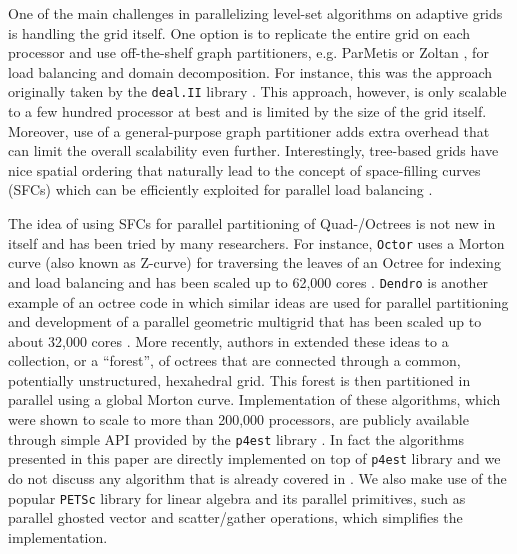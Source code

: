 One of the main challenges in parallelizing level-set algorithms on adaptive grids is handling the grid itself. One option is to replicate the entire grid on each processor and use off-the-shelf graph partitioners, e.g. ParMetis \cite{Karypis;Kumar:98:A-parallel-algorithm} or Zoltan \cite{Boman;Catalyurek;Chevalier;etal:12:The-Zoltan-and-Isorr}, for load balancing and domain decomposition. For instance, this was the approach originally taken by the \texttt{deal.II} library \cite{Bangerth;Hartmann;Kanschat:07:deal.II----a-General}. This approach, however, is only scalable to a few hundred processor at best and is limited by the size of the grid itself. Moreover, use of a general-purpose graph partitioner adds extra overhead that can limit the overall scalability even further. Interestingly, tree-based grids have nice spatial ordering that naturally lead to the concept of space-filling curves (SFCs) which can be efficiently exploited for parallel load balancing \cite{Aluru;Sevilgen:97:Parallel-domain-deco,Campbell;Devine;Flaherty;etal:03:Dynamic-octree-load-}.

The idea of using SFCs for parallel partitioning of Quad-/Octrees is not new in itself and has been tried by many researchers. For instance, \texttt{Octor} \cite{Tu;OHallaron;Ghattas:05:Scalable-parallel-oc} uses a Morton curve (also known as Z-curve) for traversing the leaves of an Octree for indexing and load balancing and has been scaled up to 62,000 cores \cite{Burstedde;Ghattas;Gurnis;etal:08:Scalable-adaptive-ma}. \texttt{Dendro} \cite{Sampath;Adavani;Sundar;etal:08:Dendro:-parallel-alg} is another example of an octree code in which similar ideas are used for parallel partitioning and development of a parallel geometric multigrid that has been scaled up to about 32,000 cores \cite{Sampath;Biros:10:A-parallel-geometric}. More recently, authors in \cite{Burstedde;Wilcox;Ghattas:11:p4est:-Scalable-Algo} extended these ideas to a collection, or a ``forest'', of octrees that are connected through a common, potentially unstructured, hexahedral grid. This forest is then partitioned in parallel using a global Morton curve. Implementation of these algorithms, which were shown to scale to more than 200,000 processors, are publicly available through simple API provided by the \texttt{p4est} library \cite{p4est-github}. In fact the algorithms presented in this paper are directly implemented on top of \texttt{p4est} library and we do not discuss any algorithm that is already covered in \cite{Burstedde;Wilcox;Ghattas:11:p4est:-Scalable-Algo}. We also make use of the popular \texttt{PETSc} \cite{Balay;Abhyankar;Adams;etal:14:PETSc-Web-page} library for linear algebra and its parallel primitives, such as parallel ghosted vector and scatter/gather operations, which simplifies the implementation. 

